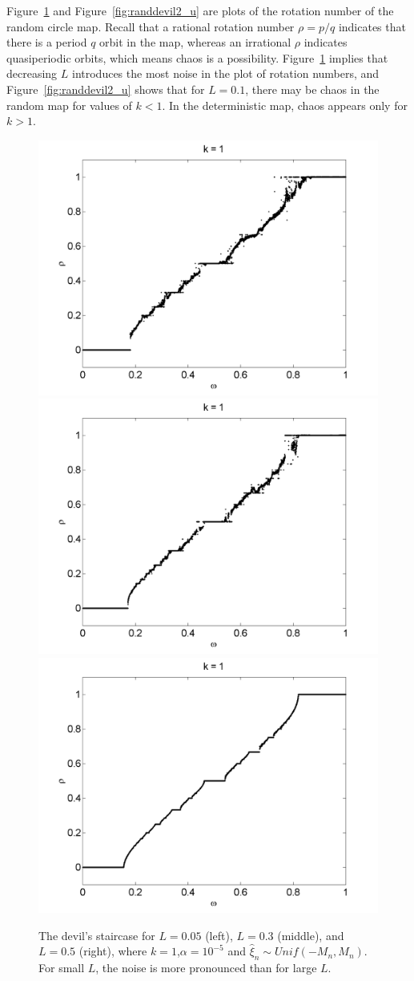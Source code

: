 Figure~\ref{fig:randdevil1_u} and Figure~\ref{fig:randdevil2_u} are
plots of the rotation number of the random circle map. Recall that a
rational rotation number $\rho = p/q$ indicates that there is a period
$q$ orbit in the map, whereas an irrational $\rho$ indicates
quasiperiodic orbits, which means chaos is a
possibility. Figure~\ref{fig:randdevil1_u} implies that decreasing $L$
introduces the most noise in the plot of rotation numbers, and
Figure~\ref{fig:randdevil2_u} shows that for $L=0.1$, there may be
chaos in the random map for values of $k<1$. In the deterministic map,
chaos appears only for $k>1$.

\begin{figure}[H]\linespread{1}
\caption[The devil's staircase for the random circle map, varying $L$
(uniform distribution), $\alpha = 10^{-5}$]{The devil's
  staircase for $L=0.05$ (left), $L=0.3$ (middle), and $L=0.5$ (right), where $k=1$,$\alpha = 10^{-5}$ and $\hat{\xi}_n\sim Unif(-M_n,M_n)$. For small $L$, the noise is more pronounced than for large $L$.}\label{fig:randdevil1_u}
\centering
\includegraphics[width=.33\textwidth]{figs/rcirc_u_devil_k1_L005.png}\hfill
\includegraphics[width=.33\textwidth]{figs/rcirc_u_devil_k1_L01.png}\hfill
\includegraphics[width=.33\textwidth]{figs/rcirc_u_devil_k1_L05.png}
\end{figure}

